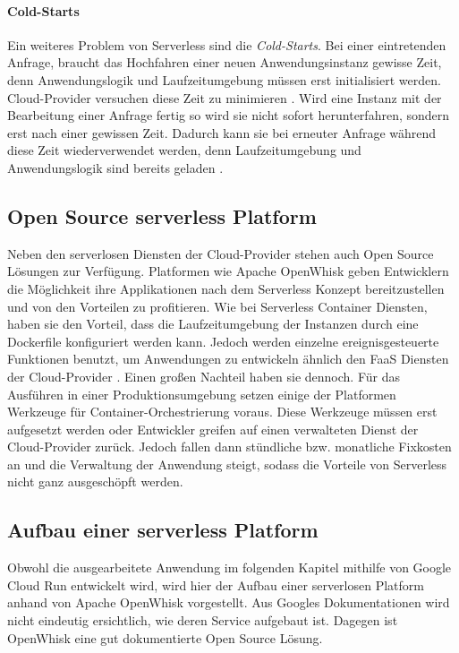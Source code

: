 \paragraph{Cold-Starts} Ein weiteres Problem von Serverless sind die \emph{Cold-Starts}.
Bei einer eintretenden Anfrage, braucht das Hochfahren einer neuen Anwendungsinstanz
gewisse Zeit, denn Anwendungslogik und Laufzeitumgebung müssen erst initialisiert werden.
Cloud-Provider versuchen diese Zeit zu minimieren \cite{Firecracker}. Wird eine Instanz mit der Bearbeitung einer Anfrage
fertig so wird sie nicht sofort herunterfahren, sondern erst nach einer gewissen Zeit.
Dadurch kann sie bei erneuter Anfrage während diese Zeit wiederverwendet werden, denn Laufzeitumgebung und
Anwendungslogik sind bereits geladen \cite{ColdStartComp}.

\subsection{Open Source serverless Platform}

Neben den serverlosen Diensten der Cloud-Provider stehen
auch Open Source Lösungen zur Verfügung. Platformen wie
Apache OpenWhisk \cite{OpenWhiskGithub} geben
Entwicklern die Möglichkeit ihre Applikationen
nach dem Serverless Konzept bereitzustellen und
von den Vorteilen zu profitieren. Wie bei Serverless
Container Diensten, haben sie den Vorteil,
dass die Laufzeitumgebung der Instanzen durch
eine Dockerfile konfiguriert werden kann.
Jedoch werden einzelne ereignisgesteuerte Funktionen benutzt,
um Anwendungen zu entwickeln ähnlich den FaaS Diensten der
Cloud-Provider \cite{OpenWhiskGithub}.
Einen großen Nachteil haben sie dennoch.
Für das Ausführen in einer Produktionsumgebung setzen einige
der Platformen Werkzeuge für Container-Orchestrierung voraus.
Diese Werkzeuge müssen erst aufgesetzt werden oder Entwickler greifen auf
einen verwalteten Dienst der Cloud-Provider zurück. Jedoch fallen
dann stündliche bzw. monatliche Fixkosten an und die
Verwaltung der Anwendung steigt, sodass die Vorteile
von Serverless nicht ganz ausgeschöpft werden.

\subsection{Aufbau einer serverless Platform}
Obwohl die ausgearbeitete Anwendung im folgenden Kapitel
mithilfe von Google Cloud Run entwickelt wird,
wird hier der Aufbau einer serverlosen Platform
anhand von Apache OpenWhisk vorgestellt.
Aus Googles Dokumentationen wird nicht eindeutig ersichtlich, wie
deren Service aufgebaut ist. Dagegen ist OpenWhisk eine
gut dokumentierte Open Source Lösung.

